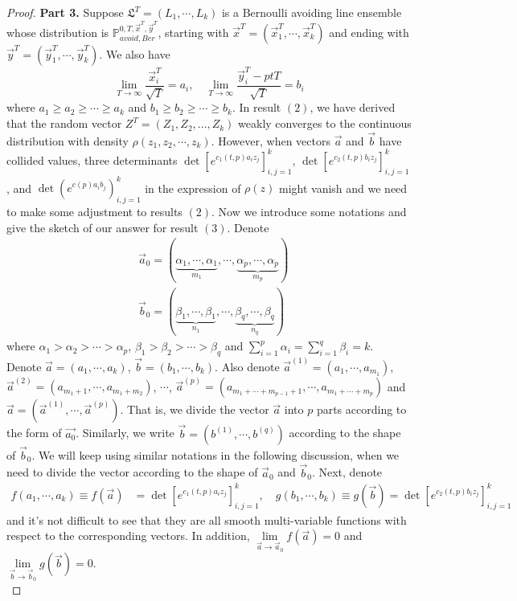 \begin{proof}
\noindent\textbf{Part 3. }
Suppose $\mathfrak{L}^{T}=(L_{1},\cdots,L_{k})$ is a Bernoulli avoiding line ensemble whose distribution is $\mathbb{P}_{avoid, Ber}^{0,T,\vec{x}^{T},\vec{y}^{T}}$, starting with $\vec{x}^{T}=(\vec{x}^{T}_{1},\cdots,\vec{x}^{T}_{k})$ and ending with $\vec{y}^{T}=(\vec{y}^{T}_{1},\cdots,\vec{y}^{T}_{k})$. We also have $$\lim_{T\rightarrow\infty}\frac{\vec{x}_{i}^{T}}{\sqrt{T}}=a_{i}, \quad\lim_{T\rightarrow\infty}\frac{\vec{y}_{i}^{T}-ptT}{\sqrt{T}}=b_{i}$$ where $a_{1}\geq a_{2}\geq\cdots\geq a_{k}$ and $b_{1}\geq b_{2}\geq\cdots\geq b_{k}$. In result $(2)$, we have derived that the random vector $Z^{T}=(Z_{1},Z_{2},\dots,Z_{k})$ weakly converges to the continuous distribution with density $\rho(z_{1},z_{2},\cdots,z_{k})$. However, when vectors $\vec{a}$ and $\vec{b}$ have collided values, three determinants $\det[e^{c_1(t,p)a_{i}z_{j}}]_{i,j=1}^{k}$, $\det[e^{c_2(t,p)b_{i}z_{j}}]_{i,j=1}^{k}$, and $\det(e^{c(p)a_{i}b_{j}})_{i,j=1}^{k}$ in the expression of $\rho(z)$ might vanish and we need to make some adjustment to results $(2)$. Now we introduce some notations and give the sketch of our answer for result $(3)$.
Denote
\begin{align*}
	&\vec{a}_{0}=(\underbrace{\alpha_{1},\cdots,\alpha_{1}}_{m_{1}},\cdots,\underbrace{\alpha_{p},\cdots,\alpha_{p}}_{m_{p}})\\
	&\vec{b}_{0}=(\underbrace{\beta_{1},\cdots,\beta_{1}}_{n_{1}},\cdots,\underbrace{\beta_{q},\cdots,\beta_{q}}_{n_{q}})
\end{align*}
where $\alpha_{1}>\alpha_{2}>\cdots>\alpha_{p}$, $\beta_{1}>\beta_{2}>\cdots>\beta_{q}$ and $\sum_{i=1}^{p}\alpha_{i}=\sum_{i=1}^{q}\beta_{i}=k$. Denote $\vec{a}=(a_{1},\cdots,a_{k})$, $\vec{b}=(b_{1},\cdots,b_{k})$. Also denote $\vec{a}^{(1)}=(a_{1},\cdots,a_{m_1})$, $\vec{a}^{(2)}=(a_{m_{1}+1},\cdots,a_{m_1+m_2})$, $\cdots$, $\vec{a}^{(p)}=(a_{m_1+\cdots+m_{p-1}+1},\cdots, a_{m_1+\cdots+m_{p}})$ and $\vec{a}=(\vec{a}^{(1)},\cdots,\vec{a}^{(p)})$. That is, we divide the vector $\vec{a}$ into $p$ parts according to the form of $\vec{a_{0}}$. Similarly, we write $\vec{b}=(b^{(1)},\cdots,b^{(q)})$ according to the shape of $\vec{b}_{0}$. We will keep using similar notations in the following discussion, when we need to divide the vector according to the shape of $\vec{a}_{0}$ and $\vec{b}_{0}$. Next, denote
\begin{align*}
	f(a_{1},\cdots,a_{k})\equiv f(\vec{a})&=\det[e^{c_1(t,p)a_{i}z_{j}}]_{i,j=1}^{k},\quad g(b_{1},\cdots,b_{k})\equiv g(\vec{b})=\det[e^{c_2(t,p)b_{i}z_{j}}]_{i,j=1}^{k}
\end{align*} 
and it's not difficult to see that they are all smooth multi-variable functions with respect to the corresponding vectors. In addition, $\lim\limits_{\vec{a}\rightarrow\vec{a}_{0}}f(\vec{a})=0$ and $\lim\limits_{\vec{b}\rightarrow\vec{b}_{0}}g(\vec{b})=0$. \\


\end{proof}
